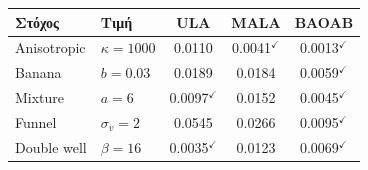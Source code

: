 \begin{tabular}{llccc}
\toprule
Στόχος & Τιμή & ULA & MALA & BAOAB \\
\midrule
Anisotropic & $\kappa=1000$ & 0.0110 & 0.0041$^{\checkmark}$ & 0.0013$^{\checkmark}$ \\
Banana & $b=0.03$ & 0.0189 & 0.0184 & 0.0059$^{\checkmark}$ \\
Mixture & $a=6$ & 0.0097$^{\checkmark}$ & 0.0152 & 0.0045$^{\checkmark}$ \\
Funnel & $\sigma_v=2$ & 0.0545 & 0.0266 & 0.0095$^{\checkmark}$ \\
Double well & $\beta=16$ & 0.0035$^{\checkmark}$ & 0.0123 & 0.0069$^{\checkmark}$ \\
\bottomrule
\end{tabular}
